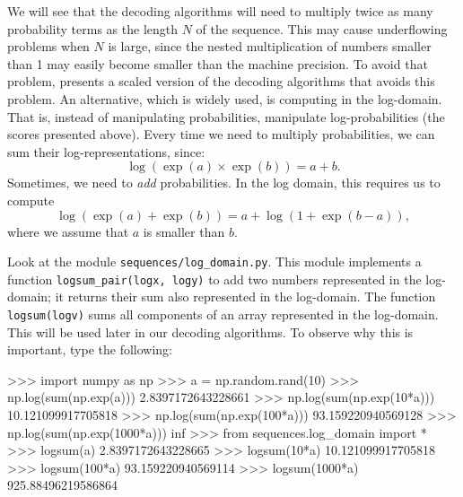 We will see that the decoding algorithms 
will need to multiply twice as many probability terms as 
the length $N$ of the sequence. 
This may cause underflowing problems 
when $N$ is large, since the nested multiplication of numbers smaller than 1
may easily become smaller than the machine precision. To avoid that
problem, \cite{rabiner} presents a scaled version of the decoding algorithms that avoids this problem.
An alternative, which is widely used, is computing
in the log-domain. That is, instead of 
manipulating probabilities, manipulate log-probabilities (the scores presented above). 
Every time we need to multiply probabilities, 
we can sum their log-representations, since:
\begin{equation}
\log(\exp(a) \times \exp(b)) = a+b.
\end{equation}
Sometimes, we need to \emph{add} probabilities. 
In the log domain, this requires us to compute 
\begin{equation}
\log(\exp(a) + \exp(b)) = a + \log(1 + \exp(b-a)),
\end{equation}
where we assume that $a$ is smaller than $b$.


\begin{exercise}
Look at the module {\tt sequences/log\_domain.py}. 
This module implements a function
{\tt logsum\_pair(logx, logy)} to 
add two numbers represented in the log-domain;
it returns their sum also represented in the log-domain. The function {\tt logsum(logv)} 
sums all components of an array 
represented in the log-domain. 
This will be used later in our decoding algorithms.
To observe why this is important, type the 
following:
\begin{python}
>>> import numpy as np
>>> a = np.random.rand(10)
>>> np.log(sum(np.exp(a)))
2.8397172643228661
>>> np.log(sum(np.exp(10*a)))
10.121099917705818
>>> np.log(sum(np.exp(100*a)))
93.159220940569128
>>> np.log(sum(np.exp(1000*a)))
inf
>>> from sequences.log_domain import *
>>> logsum(a)
2.8397172643228665
>>> logsum(10*a)
10.121099917705818
>>> logsum(100*a)
93.159220940569114
>>> logsum(1000*a)
925.88496219586864
\end{python}
\end{exercise}


